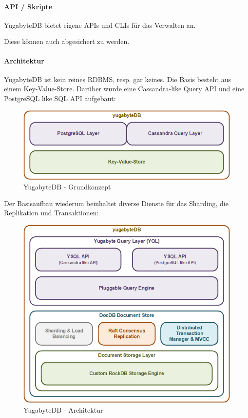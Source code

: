 \begin{flushleft}
    \paragraph{API / Skripte}
    YugabyteDB bietet eigene APIs\cite{ZXXLVVYW} und CLIs\cite{8846IPNK} für das Verwalten an.
\end{flushleft}
\begin{flushleft}
    Diese können auch abgesichert zu werden.
\end{flushleft}
\begin{flushleft}
    \paragraph{Architektur}
    YugabyteDB ist kein reines \Gls{RDBMS}, resp. gar keines.
    Die Basis besteht aus einem \Gls{Key-Value-Store}.
    Darüber wurde eine \Gls{Cassandra}-like Query API und eine \Gls{PostgreSQL} like SQL API aufgebaut:
    \begin{figure}[H]
        \centering
        \includegraphics[width=0.8\linewidth]{source/implementation/evaluation/postgresql_ha_solutions/yugabytedb/yugabytedb-concept}
        \caption{YugabyteDB - Grundkonzept}
        \label{fig:yugabytedb-concept}
    \end{figure}
\end{flushleft}
\begin{flushleft}
    Der Basisaufbau wiederum beinhaltet diverse Dienste für das Sharding, die Replikation und Transaktionen:
    \begin{figure}[H]
        \centering
        \includegraphics[width=0.8\linewidth]{source/implementation/evaluation/postgresql_ha_solutions/yugabytedb/yugabytedb-basic-archicture}
        \caption{YugabyteDB - Architektur}
        \label{fig:yugabytedb-basic-archicture}
    \end{figure}
\end{flushleft}
